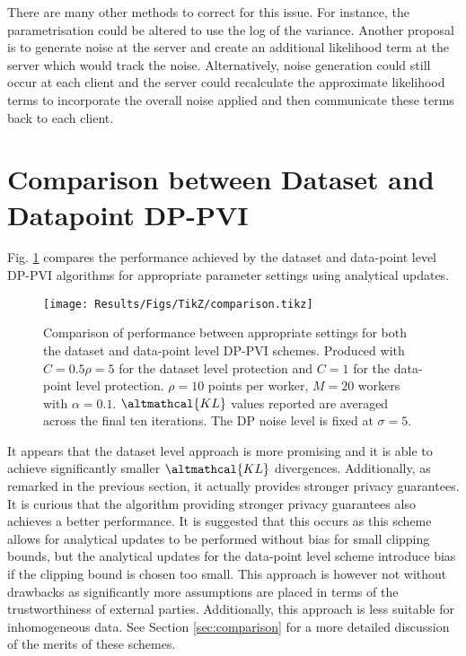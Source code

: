 There are many other methods to correct for this issue. For instance, the parametrisation could be altered to use the log of the variance. Another proposal is to generate noise at the server and create an additional likelihood term at the server which would track the noise. Alternatively, noise generation could still occur at each client and the server could recalculate the approximate likelihood terms to incorporate the overall noise applied and then communicate these terms back to each client.  

\section{Comparison between Dataset and Datapoint DP-PVI}
Fig. \ref{fig:results-comp} compares the performance achieved by the dataset and data-point level DP-PVI algorithms for appropriate parameter settings using analytical updates.

\begin{figure}
	\texttt{[image: Results/Figs/TikZ/comparison.tikz]}
	\centering
	\caption{\label{fig:results-comp} Comparison of performance between appropriate settings for both the dataset and data-point level DP-PVI schemes. Produced with $C=0.5\rho = 5$ for the dataset level protection and $C=1$ for the data-point level protection. $\rho = 10$ points per worker, $M = 20$ workers with $\alpha = 0.1$. $\altmathcal{KL}$ values reported are averaged across the final ten iterations. The DP noise level is fixed at $\sigma =5$.}
\end{figure}

It appears that the dataset level approach is more promising and it is able to achieve significantly smaller $\altmathcal{KL}$ divergences. Additionally, as remarked in the previous section, it actually provides stronger privacy guarantees. It is curious that the algorithm providing stronger privacy guarantees also achieves a better performance. It is suggested that this occurs as this scheme allows for analytical updates to be performed without bias for small clipping bounds, but the analytical updates for the data-point level scheme introduce bias if the clipping bound is chosen too small. This approach is however not without drawbacks as significantly more assumptions are placed in terms of the trustworthiness of external parties. Additionally, this approach is less suitable for inhomogeneous data. See Section \ref{sec:comparison} for a more detailed discussion of the merits of these schemes. 